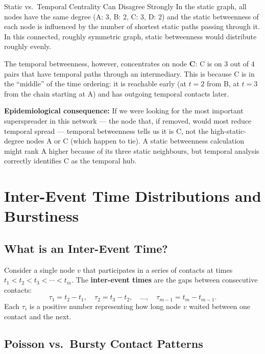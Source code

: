 \begin{keyinsight}{Static vs.\ Temporal Centrality Can Disagree Strongly}
In the static graph, all nodes have the same degree (A: 3, B: 2, C: 3, D: 2) and the static
betweenness of each node is influenced by the number of shortest static paths passing through
it. In this connected, roughly symmetric graph, static betweenness would distribute roughly
evenly.

The temporal betweenness, however, concentrates on node \textbf{C}: C is on 3 out of 4 pairs
that have temporal paths through an intermediary. This is because C is in the ``middle'' of
the time ordering: it is reachable early (at $t=2$ from B, at $t=3$ from the chain starting
at A) and has outgoing temporal contacts later.

\textbf{Epidemiological consequence:} If we were looking for the most important superspreader
in this network --- the node that, if removed, would most reduce temporal spread --- temporal
betweenness tells us it is C, not the high-static-degree nodes A or C (which happen to tie).
A static betweenness calculation might rank A higher because of its three static neighbours,
but temporal analysis correctly identifies C as the temporal hub.
\end{keyinsight}

\section{Inter-Event Time Distributions and Burstiness}
\label{sec:interevent_times}

\subsection{What is an Inter-Event Time?}

Consider a single node $v$ that participates in a series of contacts at times
$t_1 < t_2 < t_3 < \cdots < t_m$. The \textbf{inter-event times} are the gaps between
consecutive contacts:
\[
  \tau_1 = t_2 - t_1, \quad \tau_2 = t_3 - t_2, \quad \ldots, \quad \tau_{m-1} = t_m - t_{m-1}.
\]
Each $\tau_i$ is a positive number representing how long node $v$ waited between one contact
and the next.

\subsection{Poisson vs.\ Bursty Contact Patterns}

